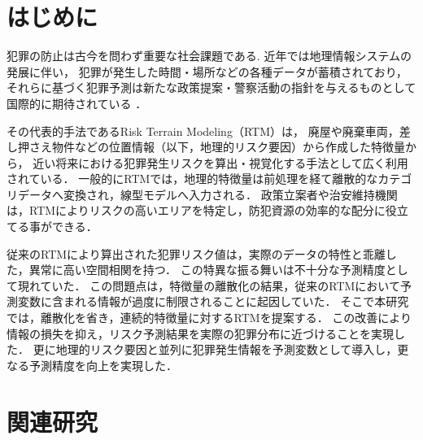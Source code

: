 \section{はじめに}
犯罪の防止は古今を問わず重要な社会課題である.
近年では地理情報システムの発展に伴い，
犯罪が発生した時間・場所などの各種データが蓄積されており\cite{ChicagoDataPortal}，
それらに基づく犯罪予測は新たな政策提案・警察活動の指針を与えるものとして国際的に期待されている
\cite{犯罪予測}．

その代表的手法であるRisk Terrain Modeling（RTM）\cite{caplan2015risk}は，
廃屋や廃棄車両，差し押さえ物件などの位置情報（以下，地理的リスク要因）から作成した特徴量から，
近い将来における犯罪発生リスクを算出・視覚化する手法として広く利用されている\cite{地理的犯罪予測研究の潮流}．
一般的にRTMでは，地理的特徴量は前処理を経て離散的なカテゴリデータへ変換され，線型モデルへ入力される\cite{犯罪予測, caplan2015risk}．
政策立案者や治安維持機関は，RTMによりリスクの高いエリアを特定し，防犯資源の効率的な配分に役立てる事ができる\cite{犯罪予測}．

従来のRTMにより算出された犯罪リスク値は，実際のデータの特性と乖離した，異常に高い空間相関を持つ．
この特異な振る舞いは不十分な予測精度として現れていた．
この問題点は，特徴量の離散化の結果，従来のRTMにおいて予測変数に含まれる情報が過度に制限されることに起因していた．
そこで本研究では，離散化を省き，連続的特徴量に対するRTMを提案する．
この改善により情報の損失を抑え，リスク予測結果を実際の犯罪分布に近づけることを実現した．
更に地理的リスク要因と並列に犯罪発生情報を予測変数として導入し，更なる予測精度を向上を実現した．

\section{関連研究}
\label{chapter_2}
